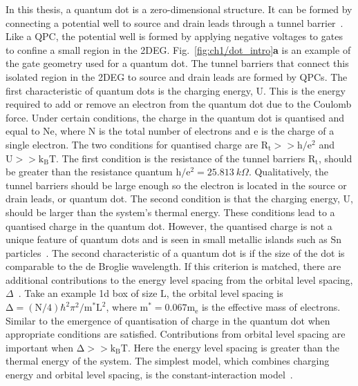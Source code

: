 In this thesis, a quantum dot is a zero-dimensional structure. It can be formed by connecting a potential well to source and drain leads through a tunnel barrier~\cite{spins_in_qd}. Like a QPC, the potential well is formed by applying negative voltages to gates to confine a small region in the 2DEG. Fig.~\ref{fig:ch1/dot_intro}\textbf{a} is an example of the gate geometry used for a quantum dot. The tunnel barriers that connect this isolated region in the 2DEG to source and drain leads are formed by QPCs. The first characteristic of quantum dots is the charging energy, $\mathrm{U}$. This is the energy required to add or remove an electron from the quantum dot due to the Coulomb force. 
Under certain conditions, the charge in the quantum dot is quantised and equal to $\mathrm{Ne}$, where $\mathrm{N}$ is the total number of electrons and $\mathrm{e}$ is the charge of a single electron. The two conditions for quantised charge are $\mathrm{R_t}>>\mathrm{h/e^2}$ and $\mathrm{U}>>\mathrm{k_BT}$. The first condition is the resistance of the tunnel barriers $\mathrm{R_t}$, should be greater than the resistance quantum $\mathrm{h/e^2}=\qty{25.813}{k\Omega}$. Qualitatively, the tunnel barriers should be large enough so the electron is located in the source or drain leads, or quantum dot. The second condition is that the charging energy, $\mathrm{U}$, should be larger than the system's thermal energy. These conditions lead to a quantised charge in the quantum dot. However, the quantised charge is not a unique feature of quantum dots and is seen in small metallic islands such as Sn particles~\cite{first_quantised_charge}.
The second characteristic of a quantum dot is if the size of the dot is comparable to the de Broglie wavelength. If this criterion is matched, there are additional contributions to the energy level spacing from the orbital level spacing, $\Delta$~\cite{Kouwenhoven_1997_electron_transport}. Take an example 1d box of size $\mathrm{L}$, the orbital level spacing is $\mathrm{\Delta}=(\mathrm{N}/4)\hbar^2\pi^2 / \mathrm{m^*L^2}$, where $\mathrm{m^*}=0.067\mathrm{m_e}$ is the effective mass of electrons. Similar to the emergence of quantisation of charge in the quantum dot when appropriate conditions are satisfied. Contributions from orbital level spacing are important when $\mathrm{\Delta}>>\mathrm{k_BT}$. Here the energy level spacing is greater than the thermal energy of the system. The simplest model, which combines charging energy and orbital level spacing, is the constant-interaction model~\cite{Beenakker1991_constant_interaction}.

